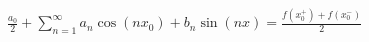 \documentclass[preview]{standalone}
\begin{document}
\begin{center}
$\displaystyle{\frac{a_0}{2}+\sum\limits_{n=1}^{\infty}a_n\cos{(nx_0)}+b_n\sin{(nx)}=\frac{f(x_0^+)+f(x_0^-)}{2}}$
\end{center}
\end{document}
